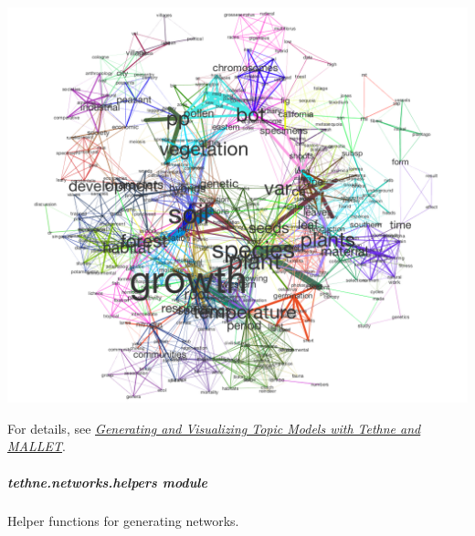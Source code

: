 \documentclass[letterpaper,10pt,english]{sphinxmanual}
\begin{document}
\begin{fulllineitems}
{\hfill\includegraphics{semantic_network.png}\hfill}

For details, see {\hyperref[tutorial.mallet:mallet-tutorial]{\emph{Generating and Visualizing Topic Models with Tethne and MALLET}}}.

\end{fulllineitems}



\subparagraph{tethne.networks.helpers module}
\label{tethne.networks.helpers:tethne-networks-helpers-module}\label{tethne.networks.helpers::doc}\label{tethne.networks.helpers:module-tethne.networks.helpers}
Helper functions for generating networks.
\end{document}
